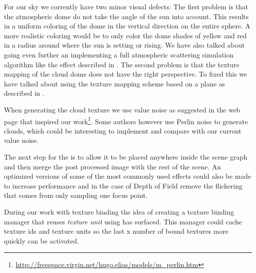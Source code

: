 For our sky we corrently have two minor visual defects: The first
problem is that the atmospheric dome do not take the angle of the sun
into account. This results in a uniform coloring of the dome in the
vertical direction on the entire sphere. A more realistic coloring
would be to only color the dome shades of yellow and red in a radius
around where the sun is setting or rising.
%
We have also talked about going even further an implementing a full
atmospheric scattering simulation algorithm like the
effect described in .
%
The second problem is that the texture mapping of the cloud dome does
not have the right perspective.
To fixed this we have talked about using the texture mapping scheme
based on a plane as described in .

When generating the cloud texture we use value noise as suggested in
the web page that inspired our
work\footnote{\url{http://freespace.virgin.net/hugo.elias/models/m_perlin.htm}}.
Some authors however use Perlin noise to generate clouds, which could
be interesting to implement and compare with our current value noise.

The next step for the  is to allow it to be
placed anywhere inside the scene graph and then merge the post
processed image with the rest of the scene. An optimized versions of
some of the most commonly used effects could also be made to increase
performance and in the case of Depth of Field remove the flickering
that comes from only sampling one focus point.

During our work with texture binding the idea of 
creating a texture binding manager that reuses \emph{texture unit}
using  has
surfaced. This manager could cache texture ids and texture units so
the last x number of bound textures more quickly can be activated.
